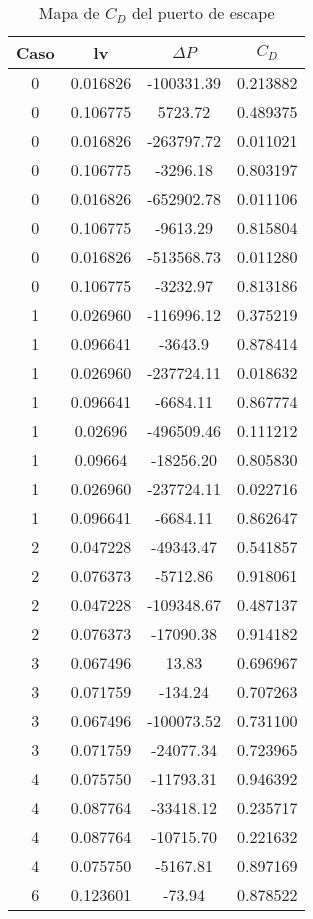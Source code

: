 \begin{table}
  \centering
    \begin{tabular}{cccc} \toprule
      Caso  & lv        & $\Delta P$    & $C_{D}$   \\ \midrule
      0     & 0.016826  & -100331.39    &  0.213882 \\
      0     & 0.106775  & 5723.72       &  0.489375 \\
      0     & 0.016826  & -263797.72    &  0.011021 \\
      0     & 0.106775  & -3296.18      &  0.803197 \\
      0     & 0.016826  & -652902.78    &  0.011106 \\
      0     & 0.106775  & -9613.29      &  0.815804 \\
      0     & 0.016826  & -513568.73    &  0.011280 \\
      0     & 0.106775  & -3232.97      &  0.813186 \\
      1     & 0.026960  & -116996.12    &  0.375219 \\
      1     & 0.096641  & -3643.9       &  0.878414 \\
      1     & 0.026960  & -237724.11    &  0.018632 \\
      1     & 0.096641  & -6684.11      &  0.867774 \\
      1     &  0.02696  & -496509.46    &  0.111212 \\
      1     &  0.09664  & -18256.20     &  0.805830 \\
      1     & 0.026960  & -237724.11    &  0.022716 \\
      1     & 0.096641  & -6684.11      &  0.862647 \\
      2     & 0.047228  & -49343.47     &  0.541857 \\
      2     & 0.076373  & -5712.86      &  0.918061 \\
      2     & 0.047228  & -109348.67    &  0.487137 \\
      2     & 0.076373  & -17090.38     &  0.914182 \\
      3     & 0.067496  & 13.83         &  0.696967 \\
      3     & 0.071759  & -134.24       &  0.707263 \\
      3     & 0.067496  & -100073.52    &  0.731100 \\
      3     & 0.071759  & -24077.34     &  0.723965 \\
      4     & 0.075750  & -11793.31     &  0.946392 \\
      4     & 0.087764  & -33418.12     &  0.235717 \\
      4     & 0.087764  & -10715.70     &  0.221632 \\
      4     & 0.075750  & -5167.81      &  0.897169 \\
      6     & 0.123601  & -73.94        &  0.878522 \\ \bottomrule
    \end{tabular}
  \caption{Mapa de $C_D$ del puerto de escape} \label{tab:mapa_cd_escape}
\end{table}

